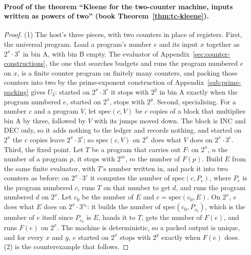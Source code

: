 \documentclass[11pt,twoside]{article}
\theoremstyle{thielethm}
\theoremstyle{thieledef}
\theoremstyle{thieledef}
\theoremstyle{thieledef}
\theoremstyle{thielethm}
\theoremstyle{thieleobs}
\theoremstyle{thielethm}
\begin{document}
\paragraph{Proof of the theorem ``Kleene for the two-counter machine, inputs written as powers of two'' (book Theorem~\ref{thm:tc-kleene}).}
\begin{proof}
(1) The host's three pieces, with two counters in place of registers. First, the universal program.
Load a program's number $e$ and its input $x$ together as $2^x \cdot 3^e$ in bin A, with bin B empty.
The evaluator of Appendix~\ref{sec:counter-constructions}, the one that searches budgets and runs the
program numbered $e$ on $x$, is a finite counter program on finitely many counters, and packing those
counters into two by the prime-exponent construction of Appendix~\ref{sub:prime-packing} gives
$U_2$: started on $2^x \cdot 3^e$ it stops with $2^y$ in bin A exactly when the program numbered $e$,
started on $2^x$, stops with $2^y$. Second, specialising. For a number $c$ and a program $V$, let
$\mathrm{spec}(c, V)$ be $c$ copies of a block that multiplies bin A by three, followed by $V$ with
its jumps moved down. The block is INC and DEC only, so it adds nothing to the ledger and records nothing, and
started on $2^x$ the $c$ copies leave $2^x \cdot 3^c$; so $\mathrm{spec}(c, V)$ on $2^x$ does what $V$
does on $2^x \cdot 3^c$. Third, the fixed point. Let $T$ be a program that carries out $F$: on $2^n$,
$n$ the number of a program $p$, it stops with $2^m$, $m$ the number of $F(p)$. Build $E$ from the
same finite evaluator, with $T$'s number written in, and pack it into two counters as before: on
$2^x \cdot 3^c$ it computes the number of $\mathrm{spec}(c, P_c)$, where $P_c$ is the program numbered
$c$, runs $T$ on that number to get $d$, and runs the program numbered $d$ on $2^x$. Let $c_0$ be the
number of $E$ and $e = \mathrm{spec}(c_0, E)$. On $2^x$, $e$ does what $E$ does on
$2^x \cdot 3^{c_0}$: it builds the number of $\mathrm{spec}(c_0, P_{c_0})$, which is the number of $e$
itself since $P_{c_0}$ is $E$, hands it to $T$, gets the number of $F(e)$, and runs $F(e)$ on $2^x$.
The machine is deterministic, so a packed output is unique, and for every $x$ and $y$, $e$ started
on $2^x$ stops with $2^y$ exactly when $F(e)$ does. (2) is the counterexample that follows.
\end{proof}
\end{document}
